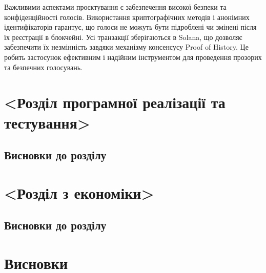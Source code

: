 \documentclass[14pt]{extreport}
\begin{document}
  Важливими аспектами проєктування є забезпечення високої безпеки та конфіденційності голосів. Використання криптографічних методів і анонімних ідентифікаторів гарантує, що голоси не можуть бути підроблені чи змінені після їх реєстрації в блокчейні. Усі транзакції зберігаються в Solana, що дозволяє забезпечити їх незмінність завдяки механізму консенсусу Proof of History. Це робить застосунок ефективним і надійним інструментом для проведення прозорих та безпечних голосувань.
  
  \chapter{<Розділ програмної реалізації та тестування>}
  
  \section{}
  \section{Висновки до розділу}
  
  \chapter{<Розділ з економіки>}
  
  \section{}
  \section{Висновки до розділу}
  
  \chapter*{Висновки}
  
\end{document}
